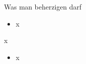 \begin{frame}{Was man beherzigen darf}
\begin{itemize}
\item x
\end{itemize}
\end{frame}




\begin{frame}{x}
\begin{itemize}
\item x
\end{itemize}
\end{frame}



